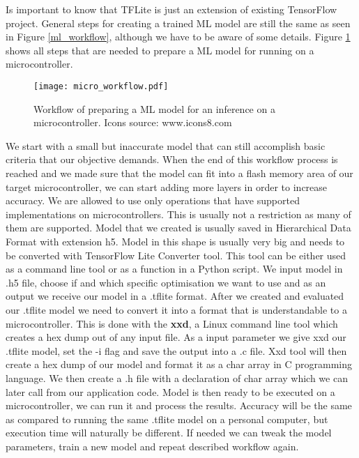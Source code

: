 Is important to know that TFLite is just an extension of existing TensorFlow project.
General steps for creating a trained ML model are still the same as seen in Figure \ref{ml_workflow}, although we have to be aware of some details.
Figure \ref{micro_workflow} shows all steps that are needed to prepare a ML model for running on a microcontroller.

\begin{figure}[ht] 
    \centering
    \texttt{[image: micro\_workflow.pdf]} 
    \caption{  Workflow of preparing a ML model for an inference on a microcontroller. Icons source: www.icons8.com}
    \label{micro_workflow}
\end{figure}

We start with a small but inaccurate model that can still accomplish basic criteria that our objective demands.
When the end of this workflow process is reached and we made sure that the model can fit into a flash memory area of our target microcontroller, we can start adding more layers in order to increase accuracy.
We are allowed to use only operations that have supported implementations on microcontrollers.
This is usually not a restriction as many of them are supported.
Model that we created is usually saved in Hierarchical Data Format with extension h5.
Model in this shape is usually very big and needs to be converted with TensorFlow Lite Converter tool.
This tool can be either used as a command line tool or as a function in a Python script.
We input model in .h5 file, choose if and which specific optimisation we want to use and as an output we receive our model in a .tflite format.
After we created and evaluated our .tflite model we need to convert it into a format that is understandable to a microcontroller.
This is done with the \textbf{xxd}, a Linux command line tool which creates a hex dump out of any input file.
As a input parameter we give xxd our .tflite model, set the -i flag and save the output into a .c file.
Xxd tool will then create a hex dump of our model and format it as a char array in C programming language. 
We then create a .h file with a declaration of char array which we can later call from our application code.
Model is then ready to be executed on a microcontroller, we can run it and process the results.
Accuracy will be the same as compared to running the same .tflite model on a personal computer, but execution time will naturally be different.
If needed we can tweak the model parameters, train a new model and repeat described workflow again.


